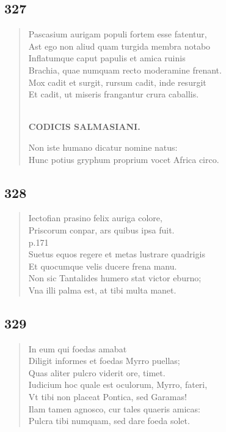 \documentclass[11pt, a4paper]{report}
\begin{document}
            \subsection*{327}
      \begin{verse}
      Pascasium aurigam populi fortem esse fatentur, \\ Ast ego non aliud quam turgida membra notabo \\ Inflatumque caput papulis et amica ruinis \\ Brachia, quae numquam recto moderamine frenant. \\ Mox cadit et surgit, rursum cadit, inde resurgit \\ Et cadit, ut miseris frangantur crura caballis. \\ 
        ﻿\pagebreak 
    \begin{center} \textbf{CODICIS SALMASIANI.} \end{center} \marginpar{[267]} Non iste humano dicatur nomine natus: \\ Hunc potius gryphum proprium vocet Africa circo. \\ 
      \end{verse}
  
            \subsection*{328}
      \begin{verse}
      Iectofian prasino felix auriga colore, \\ Priscorum conpar, ars quibus ipsa fuit. \\ p.171 \\ Suetus equos regere  \lbrack et \rbrack  metas lustrare quadrigis \\ Et quocumque velis ducere frena manu. \\ Non sic Tantalides humero stat victor eburno; \\ Vna illi palma est, at tibi multa manet. \\ 
      \end{verse}
  
            \subsection*{329}
      \begin{verse}
      In eum qui foedas amabat \\ Diligit informes et foedas Myrro puellas; \\ Quas aliter pulcro viderit ore, timet. \\ Iudicium hoc quale est oculorum, Myrro, fateri, \\ Vt tibi non placeat Pontica, sed Garamas! \\ Ilam tamen agnosco, cur tales quaeris amicas: \\ Pulcra tibi numquam, sed dare foeda solet. \\ 
      \end{verse}
  
\end{document}
